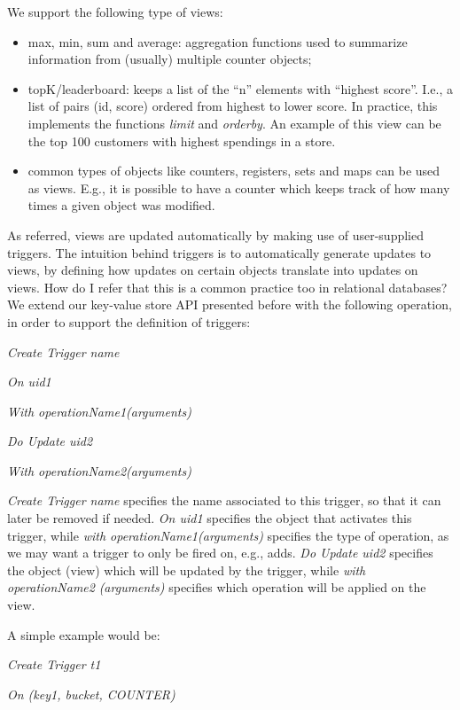 \documentclass{vldb}
\newcommand{\grumbler}[2]{{\color{red}{\bf #1:} #2}}
\newcommand{\andre}[1]{\grumbler{andre}{#1}}
\newcommand{\emphvspace}{0.5\baselineskip}
\newcommand{\firstblockemph}[1]{\vspace{\emphvspace}\hspace{2em}\emph{#1}}
\newcommand{\middleblockemph}[1]{\hspace{2em}\emph{#1}}
\newcommand{\lastblockemph}[1]{\hspace{2em}\emph{#1}\vspace{\emphvspace}}
\begin{document}
We support the following type of views:
\begin{itemize}
	\item max, min, sum and average: aggregation functions used to summarize information from (usually) multiple counter objects;
	\item topK/leaderboard: keeps a list of the ``n'' elements with ``highest score''. I.e., a list of pairs (id, score) ordered from highest to lower score. In practice, this implements the functions \emph{limit} and \emph{orderby}. An example of this view can be the top 100 customers with highest spendings in a store.
	\item common types of objects like counters, registers, sets and maps can be used as views. E.g., it is possible to have a counter which keeps track of how many times a given object was modified.
\end{itemize}

As referred, views are updated automatically by making use of user-supplied triggers.
The intuition behind triggers is to automatically generate updates to views, by defining how updates on certain objects translate into updates on views.
\andre{How do I refer that this is a common practice too in relational databases?}
We extend our key-value store API presented before with the following operation, in order to support the definition of triggers:

\firstblockemph{Create Trigger name}

\middleblockemph{On uid1}

\middleblockemph{With operationName1(arguments)}

\middleblockemph{Do Update uid2}

\lastblockemph{With operationName2(arguments)}

\emph{Create Trigger name} specifies the name associated to this trigger, so that it can later be removed if needed.
\emph{On uid1} specifies the object that activates this trigger, while \emph{with operationName1(arguments)} specifies the type of operation, as we may want a trigger to only be fired on, e.g., adds.
\emph{Do Update uid2} specifies the object (view) which will be updated by the trigger, while \emph{with}  \emph{operationName2} \emph{(arguments)} specifies which operation will be applied on the view.

A simple example would be:

\firstblockemph{Create Trigger t1}

\middleblockemph{On (key1, bucket, COUNTER)}
\end{document}
